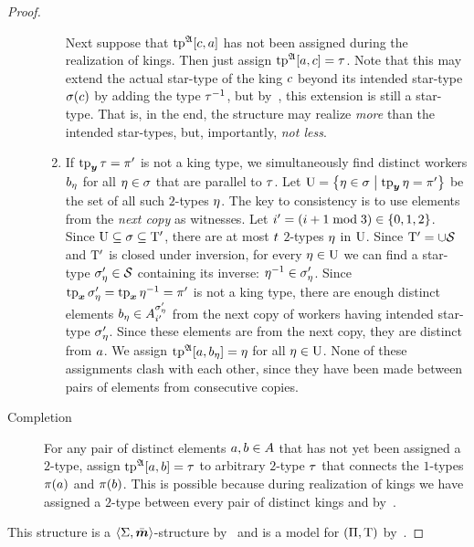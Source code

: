 \begin{proof}
\begin{description}
\begin{enumerate}
    Next suppose that $\operatorname{tp}^{\mathfrak{A}}[c,a]$ has not been assigned during the
    realization of kings. Then just assign $\operatorname{tp}^{\mathfrak{A}}[a,c] = \tau$.
    Note that this may extend the actual star-type of the king $c$ beyond its
    intended star-type $\sigma(c)$ by adding the type $\tau^{-1}$, but
    by~, this extension is still a star-type. That is,
    in the end, the structure may realize \emph{more} than the intended
    star-types, but, importantly, \emph{not less}.
    \item If $\operatorname{tp}_{\bm{y}}\tau = {\pi'}$ is not a king type, we simultaneously find
    distinct workers $b_{\eta}$ for all $\eta \in \sigma$ that are parallel to
    $\tau$.
    Let $\mathrm{U} = \left\{\eta \in \sigma\mathrel{}\middle|\mathrel{}\operatorname{tp}_{\bm{y}}\eta = {\pi'}\right\}$ be the set of
    all such $2$-types $\eta$.
    The key to consistency is to use elements from the \emph{next copy} as
    witnesses. Let ${i'} = (i+1 \bmod 3) \in \left\{0,1,2\right\}$. Since $\mathrm{U}
    \subseteq \sigma \subseteq {\mathrm{T}'}$, there are at most $t$ $2$-types $\eta$ in $\mathrm{U}$. Since ${\mathrm{T}'} = \cup\mathcal{S}$ and ${\mathrm{T}'}$ is
    closed under inversion, for every $\eta \in \mathrm{U}$ we can find a star-type
    ${\sigma_{\eta}'} \in \mathcal{S}$ containing its inverse: $\eta^{-1} \in
    {\sigma_{\eta}'}$. Since $\operatorname{tp}_{\bm{x}}{\sigma_{\eta}'} = \operatorname{tp}_{\bm{x}}\eta^{-1} = {\pi'}$ is not
    a king type, there are enough distinct elements $b_{\eta} \in
    A^{{\sigma_{\eta}'}}_{{i'}}$ from the next copy of workers having intended
    star-type ${\sigma_{\eta}'}$. Since these elements are from the next copy, they
    are distinct from $a$.
    We assign $\operatorname{tp}^{\mathfrak{A}}[a,b_{\eta}] = \eta$ for all $\eta \in \mathrm{U}$.
    None of these assignments clash with each other, since they have been made
    between pairs of elements from consecutive copies.
  \end{enumerate}
  \item[Completion] For any pair of distinct elements $a, b \in A$ that
  has not yet been assigned a $2$-type, assign $\operatorname{tp}^{\mathfrak{A}}[a,b] = \tau$ to
  arbitrary $2$-type $\tau$ that connects the $1$-types $\pi(a)$ and
  $\pi(b)$. This is possible because during realization of kings we have
  assigned a $2$-type between every pair of distinct kings and by~.
\end{description}
This structure is a $\left\langle \mathrm{\Sigma},\bar{\bm{m}} \right\rangle$-structure by~ and
is a model for $(\Pi,\mathrm{T})$ by~.
\end{proof}


